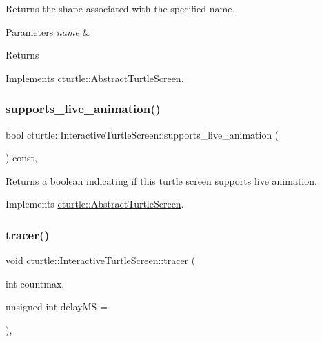 Returns the shape associated with the specified name. 
\begin{DoxyParams}{Parameters}
{\em name} & \\
\hline
\end{DoxyParams}
\begin{DoxyReturn}{Returns}

\end{DoxyReturn}


Implements \hyperlink{classcturtle_1_1AbstractTurtleScreen}{cturtle\+::\+Abstract\+Turtle\+Screen}.

\mbox{\label{classcturtle_1_1InteractiveTurtleScreen_ad28f7c6e4058541a2c4258b4455fad74}} 
\subsubsection{\texorpdfstring{supports\+\_\+live\+\_\+animation()}{supports\_live\_animation()}}
{\footnotesize\ttfamily bool cturtle\+::\+Interactive\+Turtle\+Screen\+::supports\+\_\+live\+\_\+animation (\begin{DoxyParamCaption}{ }\end{DoxyParamCaption}) const\hspace{0.3cm}{\ttfamily [inline]}, {\ttfamily [virtual]}}

\begin{DoxyReturn}{Returns}
a boolean indicating if this turtle screen supports live animation. 
\end{DoxyReturn}


Implements \hyperlink{classcturtle_1_1AbstractTurtleScreen_aa9651fa98eefdb83fd99d476217b5414}{cturtle\+::\+Abstract\+Turtle\+Screen}.

\mbox{\label{classcturtle_1_1InteractiveTurtleScreen_ac6cbbcf714c490abb300cd6a931950f3}} 
\subsubsection{\texorpdfstring{tracer()}{tracer()}}
{\footnotesize\ttfamily void cturtle\+::\+Interactive\+Turtle\+Screen\+::tracer (\begin{DoxyParamCaption}\item[{int}]{countmax,  }\item[{unsigned int}]{delay\+MS = {} }\end{DoxyParamCaption})\hspace{0.3cm}{\ttfamily [inline]}, {\ttfamily [virtual]}}

